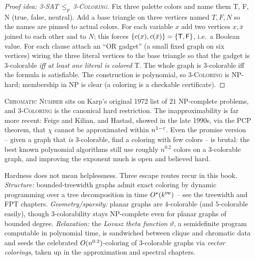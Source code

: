 \begin{proof}[Proof idea: \textsc{3-SAT}\,$\le_p$\,\textsc{3-Coloring}]
Fix three palette colors and name them \textsf{T}, \textsf{F}, \textsf{N} (true,
false, neutral). Add a base triangle on three vertices named $T,F,N$ so the names
are pinned to actual colors. For each variable $x$ add two vertices $x,\bar x$
joined to each other and to $N$; this forces $\{c(x),c(\bar x)\}=\{\textsf
T,\textsf F\}$, i.e.\ a Boolean value. For each clause attach an ``OR gadget'' (a
small fixed graph on six vertices) wiring the three literal vertices to the base
triangle so that the gadget is $3$-colorable \emph{iff at least one literal is
colored} \textsf{T}. The whole graph is $3$-colorable iff the formula is
satisfiable. The construction is polynomial, so \textsc{3-Coloring} is NP-hard;
membership in NP is clear (a coloring is a checkable certificate).
\end{proof}

\begin{historybox}
\textsc{Chromatic Number} sits on Karp's original 1972 list of $21$ NP-complete
problems, and \textsc{3-Coloring} is the canonical hard restriction. The
inapproximability is far more recent: Feige and Kilian, and Hastad, showed in the
late 1990s, via the PCP theorem, that $\chi$ cannot be approximated within
$n^{1-\varepsilon}$. Even the promise version -- given a graph that \emph{is}
$3$-colorable, find a coloring with few colors -- is brutal: the best known
polynomial algorithms still use roughly $n^{0.2}$ colors on a $3$-colorable graph,
and improving the exponent much is open and believed hard.
\end{historybox}

\begin{connectionbox}
Hardness does not mean helplessness. Three escape routes recur in this book.
\emph{Structure:} bounded-treewidth graphs admit exact coloring by dynamic
programming over a tree decomposition in time $O^\star(k^{\operatorname{tw}})$ -- see the
treewidth and FPT chapters. \emph{Geometry/sparsity:} planar graphs are
$4$-colorable (and $5$-colorable easily), though $3$-colorability stays NP-complete
even for planar graphs of bounded degree. \emph{Relaxation:} the \emph{Lovasz theta
function} $\vartheta$, a semidefinite program computable in polynomial time, is
sandwiched between clique and chromatic data and seeds the celebrated
$O(n^{0.2})$-coloring of $3$-colorable graphs via \emph{vector colorings}, taken
up in the approximation and spectral chapters.
\end{connectionbox}

